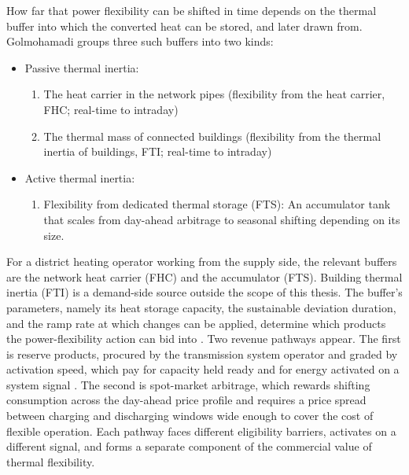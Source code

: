 How far that power flexibility can be shifted in time depends on the thermal buffer into which the converted heat can be stored, and later drawn from. Golmohamadi \cite{golmohamadi_integration_2022} groups three such buffers into two kinds:
\begin{itemize}
  \item Passive thermal inertia:
  \begin{enumerate}
    \item The heat carrier in the network pipes (flexibility from the heat carrier, FHC; real-time to intraday)
    \item The thermal mass of connected buildings (flexibility from the thermal inertia of buildings, FTI; real-time to intraday)
  \end{enumerate}
  \item Active thermal inertia:
  \begin{enumerate}
    \item Flexibility from dedicated thermal storage (FTS): An accumulator tank that scales from day-ahead arbitrage to seasonal shifting depending on its size.
  \end{enumerate}
\end{itemize}
For a district heating operator working from the supply side, the relevant buffers are the network heat carrier (FHC) and the accumulator (FTS). Building thermal inertia (FTI) is a demand-side source outside the scope of this thesis. The buffer's parameters, namely its heat storage capacity, the sustainable deviation duration, and the ramp rate at which changes can be applied, determine which products the power-flexibility action can bid into \cite{golmohamadi_integration_2022}. Two revenue pathways appear. The first is reserve products, procured by the transmission system operator and graded by activation speed, which pay for capacity held ready and for energy activated on a system signal \cite{dalen_fleksibilitet_nodate}. The second is spot-market arbitrage, which rewards shifting consumption across the day-ahead price profile and requires a price spread between charging and discharging windows wide enough to cover the cost of flexible operation. Each pathway faces different eligibility barriers, activates on a different signal, and forms a separate component of the commercial value of thermal flexibility.

